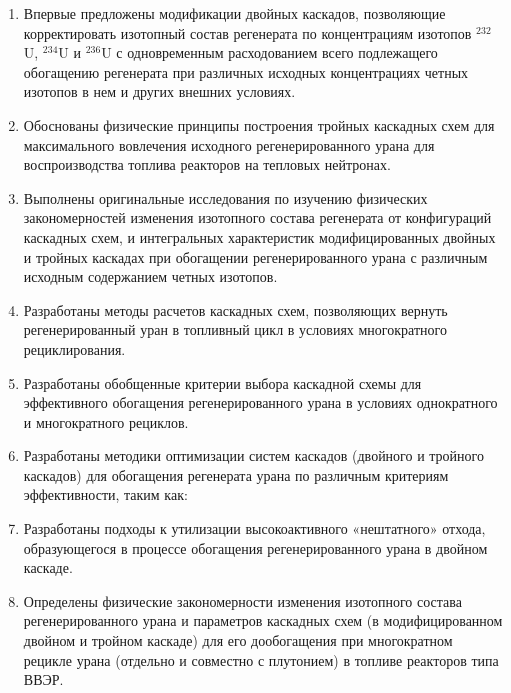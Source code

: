 {\novelty}
\begin{enumerate}
  \item Впервые предложены модификации двойных каскадов, позволяющие корректировать
  изотопный состав регенерата по концентрациям изотопов $^{232}$U, $^{234}$U и $^{236}$U с одновременным расходованием всего подлежащего обогащению регенерата при различных исходных концентрациях четных изотопов в нем и других внешних условиях.
  \item Обоснованы физические принципы построения тройных каскадных схем для максимального вовлечения исходного регенерированного урана для воспроизводства топлива реакторов на тепловых нейтронах.
  \item Выполнены оригинальные исследования по изучению физических закономерностей изменения изотопного состава регенерата
  от конфигураций каскадных схем,
  и интегральных характеристик модифицированных двойных и тройных каскадах при обогащении регенерированного урана с различным исходным содержанием четных изотопов.
  \item Разработаны методы расчетов каскадных схем, позволяющих вернуть регенерированный уран в топливный цикл в условиях многократного рециклирования.
  \item Разработаны обобщенные критерии выбора каскадной схемы для эффективного обогащения регенерированного урана в условиях однократного и многократного рециклов.
  \item Разработаны методики оптимизации систем каскадов (двойного и тройного каскадов) для обогащения регенерата урана по различным критериям эффективности, таким как:
  \item Разработаны подходы к утилизации высокоактивного «нештатного» отхода, образующегося в процессе обогащения регенерированного урана в двойном каскаде.
  \item Определены физические закономерности изменения изотопного состава регенерированного урана и параметров каскадных схем (в модифицированном двойном и тройном каскаде) для его дообогащения при многократном рецикле урана (отдельно и совместно с плутонием) в топливе реакторов типа ВВЭР.
\end{enumerate}

